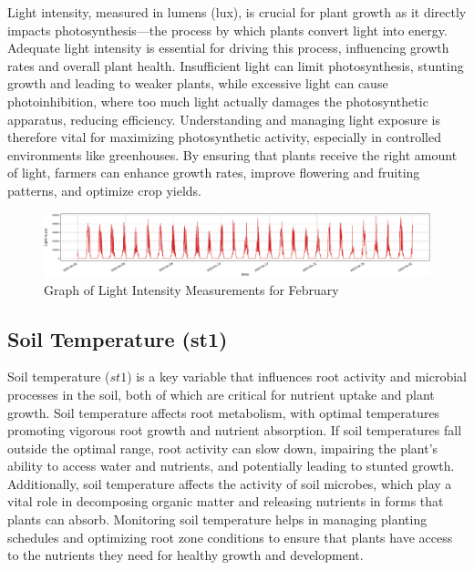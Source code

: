 Light intensity, measured in lumens (lux), is crucial for plant growth as it directly impacts photosynthesis—the process by which plants convert light into energy. Adequate light intensity is essential for driving this process, influencing growth rates and overall plant health. Insufficient light can limit photosynthesis, stunting growth and leading to weaker plants, while excessive light can cause photoinhibition, where too much light actually damages the photosynthetic apparatus, reducing efficiency. Understanding and managing light exposure is therefore vital for maximizing photosynthetic activity, especially in controlled environments like greenhouses. By ensuring that plants receive the right amount of light, farmers can enhance growth rates, improve flowering and fruiting patterns, and optimize crop yields.

\begin{figure}[htbp]
    \centering
    \includegraphics[width=15 cm]{4_ChapterMaterials/figuras/train_data_Light.pdf}
    \caption{Graph of Light Intensity Measurements for February}
    \end{figure}

\subsection{Soil Temperature (st1)}

Soil temperature (\( st1 \)) is a key variable that influences root activity and microbial processes in the soil, both of which are critical for nutrient uptake and plant growth. Soil temperature affects root metabolism, with optimal temperatures promoting vigorous root growth and nutrient absorption. If soil temperatures fall outside the optimal range, root activity can slow down, impairing the plant's ability to access water and nutrients, and potentially leading to stunted growth. Additionally, soil temperature affects the activity of soil microbes, which play a vital role in decomposing organic matter and releasing nutrients in forms that plants can absorb. Monitoring soil temperature helps in managing planting schedules and optimizing root zone conditions to ensure that plants have access to the nutrients they need for healthy growth and development.

